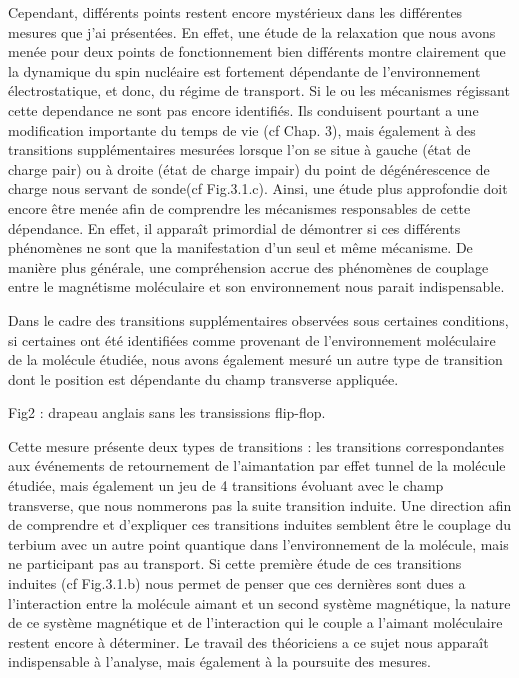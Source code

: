 Cependant, différents points restent encore mystérieux dans les différentes mesures que j'ai présentées. En effet, une étude de la relaxation que nous avons menée pour deux points de fonctionnement bien différents montre clairement que la dynamique du spin nucléaire est fortement dépendante de l'environnement électrostatique, et donc, du régime de transport. Si le ou les mécanismes régissant cette dependance ne sont pas encore identifiés. Ils conduisent pourtant a une modification importante du temps de vie  (cf Chap. 3), mais également à des transitions supplémentaires mesurées lorsque l'on se situe à gauche (état de charge pair) ou à droite (état de charge impair) du point de dégénérescence de charge nous servant de sonde(cf Fig.3.1.c). Ainsi, une étude plus approfondie doit encore être menée afin de comprendre les mécanismes responsables de cette dépendance.
En effet, il apparaît primordial de démontrer si ces différents phénomènes ne sont que la manifestation d'un seul et même mécanisme. De manière plus générale, une compréhension accrue des phénomènes de couplage entre le magnétisme moléculaire et son environnement nous parait indispensable.

Dans le cadre des transitions supplémentaires observées sous certaines conditions, si certaines ont été identifiées comme provenant de l'environnement moléculaire de la molécule étudiée, nous avons également mesuré un autre type de transition dont le position est dépendante du champ transverse appliquée.

Fig2 : drapeau anglais sans les transissions flip-flop.

Cette mesure présente deux types de transitions : les transitions correspondantes aux événements de retournement de l'aimantation par effet tunnel de la molécule étudiée, mais également un jeu de 4 transitions évoluant avec le champ transverse, que nous nommerons pas la suite transition induite. Une direction afin de comprendre et d'expliquer ces transitions induites semblent être le couplage du terbium avec un autre point quantique dans l'environnement de la molécule, mais ne participant pas au transport. Si cette première étude de ces transitions induites (cf Fig.3.1.b) nous permet de penser que ces dernières sont dues a l'interaction entre la molécule aimant et un second système magnétique, la nature de ce système magnétique et de l'interaction qui le couple a l'aimant moléculaire restent encore à déterminer. Le travail des théoriciens a ce sujet nous apparaît indispensable à l'analyse, mais également à la poursuite des mesures.



